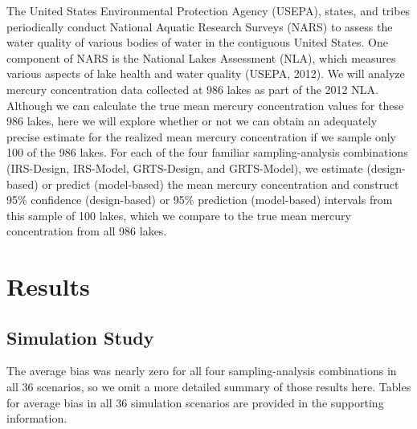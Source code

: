 \documentclass[]{elsarticle} %
\begin{document}
The United States Environmental Protection Agency (USEPA), states, and
tribes periodically conduct National Aquatic Research Surveys (NARS) to
assess the water quality of various bodies of water in the contiguous
United States. One component of NARS is the National Lakes Assessment
(NLA), which measures various aspects of lake health and water quality
(USEPA, 2012). We will analyze mercury concentration data collected at
986 lakes as part of the 2012 NLA. Although we can calculate the true
mean mercury concentration values for these 986 lakes, here we will
explore whether or not we can obtain an adequately precise estimate for
the realized mean mercury concentration if we sample only 100 of the 986
lakes. For each of the four familiar sampling-analysis combinations
(IRS-Design, IRS-Model, GRTS-Design, and GRTS-Model), we estimate
(design-based) or predict (model-based) the mean mercury concentration
and construct 95\% confidence (design-based) or 95\% prediction
(model-based) intervals from this sample of 100 lakes, which we compare
to the true mean mercury concentration from all 986 lakes.

\hypertarget{sec:results}{%
\section{Results}\label{sec:results}}

\hypertarget{sec:r_sim}{%
\subsection{Simulation Study}\label{sec:r_sim}}

The average bias was nearly zero for all four sampling-analysis
combinations in all 36 scenarios, so we omit a more detailed summary of
those results here. Tables for average bias in all 36 simulation
scenarios are provided in the supporting information.
\end{document}
